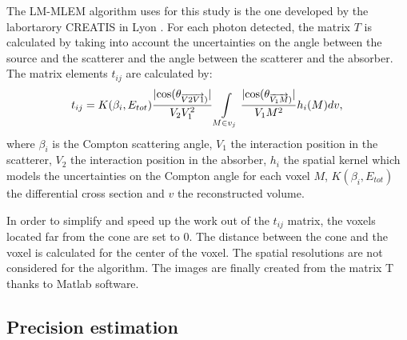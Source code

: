 \documentclass[12pt]{iopart}
\begin{document}
The LM-MLEM algorithm uses for this study is the one developed by the labortarory CREATIS in Lyon \cite{maxim_analytical_2009,lojacono_low_2013,maxim_filtered_2014,hilaire_compton_2014}.\newline
For each photon detected, the matrix $T$ is calculated by taking into account the uncertainties on the angle between the source and the scatterer and the angle between the scatterer and the absorber.
The matrix elements  $t_{ij}$  are calculated by:
\begin{equation}
 t_{ij} = K(\beta_i,E_{tot})\frac{|\rm{cos}(\theta_{\overrightarrow{V2V1})} |}{V_2V_1^2} \int\limits_{M\in v_j} \frac{|\rm{cos}(\theta_{\overrightarrow{V_1M})}| }{V_1M^2} h_i(M)dv,
 \label{eq:equation_tij_compton_med_nucleaire}\newline
\end{equation}
where $\beta_i$ is the Compton scattering angle, $V_1$ the interaction position in the scatterer, $V_2$ the interaction position in the absorber, $h_i$ the spatial kernel which models the uncertainties on the Compton angle for each voxel $M$, $K(\beta_i,E_{tot})$ the differential cross section and $v$ the reconstructed volume.\newline

In order to simplify and speed up the work out of the $t_{ij}$ matrix, the voxels located far from the cone are set to 0. The distance between the cone and the voxel is calculated for the center of the voxel. The spatial resolutions are not considered for the algorithm.\newline
The images are finally created from the matrix T thanks to Matlab software.

\subsection{Precision estimation\newline}
\end{document}
